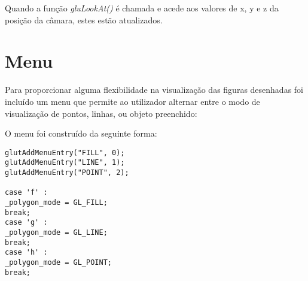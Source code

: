 Quando a função \textit{gluLookAt()} é chamada e acede aos valores de x, y e z da posição da câmara, estes estão atualizados.

\section{Menu}

Para proporcionar alguma flexibilidade na visualização das figuras desenhadas foi incluído um menu que permite ao utilizador alternar entre o modo de visualização de pontos, linhas, ou objeto preenchido:


O menu foi construído da seguinte forma:

\begin{Verbatim}
glutAddMenuEntry("FILL", 0);
glutAddMenuEntry("LINE", 1);
glutAddMenuEntry("POINT", 2);

case 'f' :
_polygon_mode = GL_FILL;
break;
case 'g' :
_polygon_mode = GL_LINE;
break;
case 'h' :
_polygon_mode = GL_POINT;
break;
\end{Verbatim}









